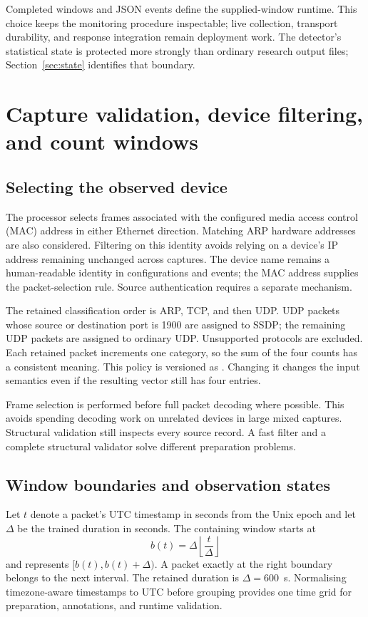 Completed windows and JSON events define the supplied-window runtime. This
choice keeps the monitoring procedure inspectable; live collection,
transport durability, and response integration remain deployment work. The
detector's statistical
state is protected more strongly than ordinary research output files;
Section~\ref{sec:state} identifies that boundary.

\section{Capture validation, device filtering, and count windows}
\label{sec:preparation}

\subsection{Selecting the observed device}

The processor selects frames associated with the configured media access
control (MAC) address in either Ethernet direction. Matching ARP hardware
addresses are also considered. Filtering on this identity avoids relying
on a device's IP address remaining unchanged across captures. The device
name remains a human-readable identity in configurations and events; the
MAC address supplies the packet-selection rule. Source authentication
requires a separate mechanism.

The retained classification order is ARP, TCP, and then UDP. UDP packets
whose source or destination port is 1900 are assigned to SSDP; the
remaining UDP packets are assigned to ordinary UDP. Unsupported protocols
are excluded. Each retained packet increments one category, so the sum of
the four counts has a consistent meaning. This policy is versioned as
. Changing it changes the
input semantics even if the resulting vector still has four entries.

Frame selection is performed before full packet decoding where possible.
This avoids spending decoding work on unrelated devices in large mixed
captures. Structural validation still inspects every source record. A fast
filter and a complete structural validator solve different preparation
problems.

\subsection{Window boundaries and observation states}

Let $t$ denote a packet's UTC timestamp in seconds from the Unix epoch and
let $\Delta$ be the trained duration in seconds. The containing window
starts at
\[
 b(t)=\Delta\left\lfloor\frac{t}{\Delta}\right\rfloor
\]
and represents $[b(t),b(t)+\Delta)$. A packet exactly at the right boundary
belongs to the next interval. The retained duration is $\Delta=600$~s.
Normalising timezone-aware timestamps to UTC before grouping provides one
time grid for preparation, annotations, and runtime validation.

